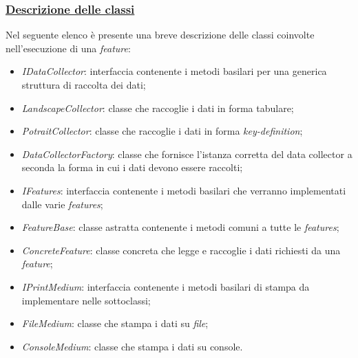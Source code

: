 \subsubsection{\underline{Descrizione delle classi}}
Nel seguente elenco è presente una breve descrizione delle classi coinvolte nell’esecuzione di una \emph{feature}:
\begin{itemize}
    \item \emph{IDataCollector}: interfaccia contenente i metodi basilari per una generica struttura di raccolta dei dati;
    \item \emph{LandscapeCollector}: classe che raccoglie i dati in forma tabulare;
    \item \emph{PotraitCollector}: classe che raccoglie i dati in forma \emph{key-definition};
    \item \emph{DataCollectorFactory}: classe che fornisce l’istanza corretta del data collector a seconda la forma in cui i dati devono essere raccolti;
    \item \emph{IFeatures}: interfaccia contenente i metodi basilari che verranno implementati dalle varie \emph{features};
    \item \emph{FeatureBase}: classe astratta contenente i metodi comuni a tutte le \emph{features};
    \item \emph{ConcreteFeature}: classe concreta che legge e raccoglie i dati richiesti da una \emph{feature};
    \item \emph{IPrintMedium}: interfaccia contenente i metodi basilari di stampa da implementare nelle sottoclassi;
    \item \emph{FileMedium}: classe che stampa i dati su \emph{file};
    \item \emph{ConsoleMedium}: classe che stampa i dati su console.
\end{itemize}

